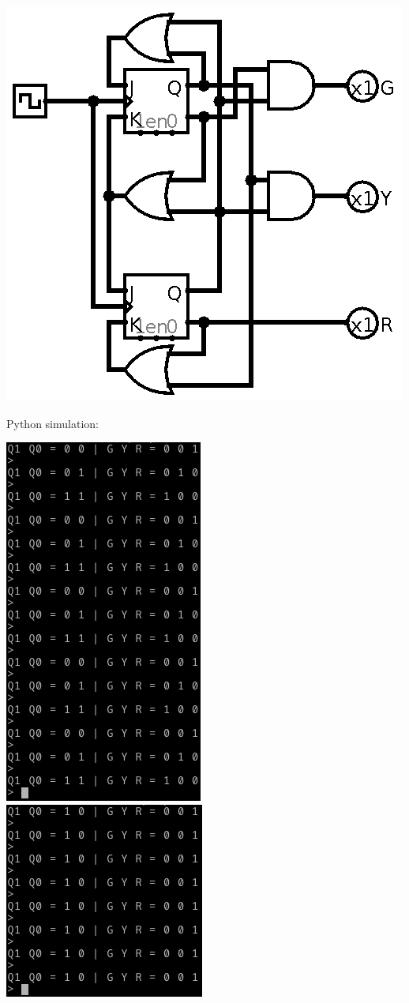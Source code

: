 \documentclass{article}
\begin{document}
\includegraphics[scale=0.5]{hw6}

Python simulation:



\noindent \includegraphics{hw6a}\\
\includegraphics{hw6b}\\
\end{document}
